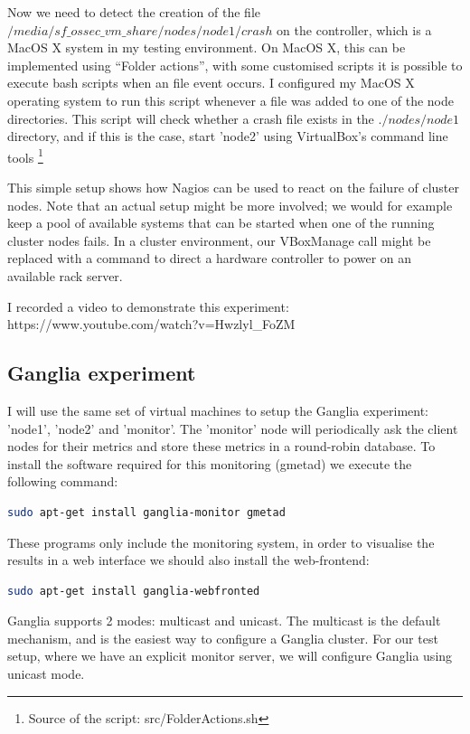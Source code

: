 \documentclass[12pt]{report}
\begin{document}
Now we need to detect the creation of the file
$/media/sf\_ossec\_vm\_share/nodes/node1/crash$  on the controller,
which is a MacOS X system in my testing environment. On MacOS X, this
can be implemented using ``Folder actions'', with some customised scripts
\cite{folder_actions_bash} it is possible to execute bash scripts when
an file event occurs.
I configured my MacOS X operating system to run this script whenever a
file was added to one of the node directories.
This script will check whether a crash file exists in the $./nodes/node1$
directory, and if this is the case, start 'node2' using VirtualBox's
command line tools \footnote{Source of the script: src/FolderActions.sh}

This simple setup shows how Nagios can be used to react on the failure
of cluster nodes. Note that an actual setup might be more
involved; we would for example keep a pool of available systems that
can be started when one of the running cluster nodes fails. In a
cluster environment, our VBoxManage call might be replaced with a
command to direct a hardware controller to power on an available rack
server.

I recorded a video to demonstrate this experiment:\\ 
https://www.youtube.com/watch?v=Hwzlyl\_FoZM
\\


\subsection{Ganglia experiment}
I will use the same set of virtual machines to setup the Ganglia
experiment: 'node1', 'node2' and 'monitor'.
The 'monitor' node will periodically ask the client nodes for their
metrics and store these metrics in a round-robin database.
To install the software required for this monitoring (gmetad) we execute the
following command:
\begin{lstlisting}[language=bash]
sudo apt-get install ganglia-monitor gmetad
\end{lstlisting} 

These programs only include the monitoring system, in order to
visualise the results in a web interface we should also install the
web-frontend:
\begin{lstlisting}[language=bash]
sudo apt-get install ganglia-webfronted
\end{lstlisting} 

Ganglia supports 2 modes: multicast and unicast.
The multicast is the default mechanism, and is the easiest way to
configure a Ganglia cluster.
For our test setup, where we have an explicit monitor server, we will
configure Ganglia using unicast mode.
\end{document}

